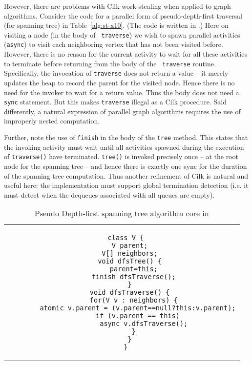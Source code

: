 However, there are problems with Cilk work-stealing when applied to
graph algorithms. Consider the code for a parallel form of
pseudo-depth-first traversal (for spanning tree) in
Table~\ref{alg:st-x10}. (The code is written in \Xten{} \cite{x10}.)
Here on visiting a node (in the body of {\tt
traverse}) we wish to spawn parallel activities ({\tt async}) to visit
each neighboring vertex that has not been visited before. However,
there is no reason for the current activity to wait for all these
activities to terminate before returning from the body of the {\tt
traverse} routine. Specifically, the invocation of {\tt traverse} does
not return a value -- it merely updates the heap to record the parent
for the visited node. Hence there is no need for the invoker to wait
for a return value. Thus the body does not need a {\tt sync}
statement. But this makes {\tt traverse} illegal as a Cilk
procedure. Said differently, a natural expression of parallel graph
algorithms requires the use of improperly nested computation.

Further, note the use of {\tt finish} in the body of the {\tt tree}
method.  This states that the invoking activity must wait until all
activities spawned during the execution of {\tt traverse()} have
terminated. {\tt tree()} is invoked precisely once -- at the root node
for the spanning tree -- and hence there is exactly one sync for the
duration of the spanning tree computation. Thus another refinement of 
Cilk is natural and useful here: the implementation must support 
global termination detection (i.e.{} it must detect when the 
dequeues associated with all queues are empty). 

\begin{table}
\centering
\scriptsize
\begin{tabular}{c}
\begin{minipage}[t]{0.5\textwidth}
\begin{verbatim} 
  class V {
    V parent;
    V[] neighbors;
    void dfsTree() {
      parent=this;
      finish dfsTraverse();
    }
    void dfsTraverse() {
      for(V v : neighbors) {
        atomic v.parent = (v.parent==null?this:v.parent);
        if (v.parent == this)
           async v.dfsTraverse();
      }
    }
  }
\end{verbatim}
\end{minipage} 
\end{tabular}
\caption{Pseudo Depth-first spanning tree algorithm core in \Xten{}}
\label{alg:dfs-x10}
\end{table}

